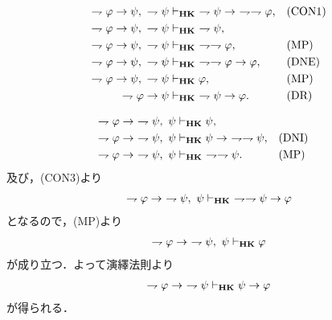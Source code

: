 	\begin{sketch}[CON3]
		\begin{align}
			\rightharpoondown \varphi \rightarrow \psi,\ \rightharpoondown \psi &\provable{\mbox{{\bf HK}}}
				\ \rightharpoondown \psi \rightarrow\ \rightharpoondown \rightharpoondown \varphi,
				&& \mbox{(CON1)} \\
			\rightharpoondown \varphi \rightarrow \psi,\ \rightharpoondown \psi &\provable{\mbox{{\bf HK}}}
				\ \rightharpoondown \psi, \\
			\rightharpoondown \varphi \rightarrow \psi,\ \rightharpoondown \psi &\provable{\mbox{{\bf HK}}}
				\ \rightharpoondown \rightharpoondown \varphi, && \mbox{(MP)} \\
			\rightharpoondown \varphi \rightarrow \psi,\ \rightharpoondown \psi &\provable{\mbox{{\bf HK}}}
				\ \rightharpoondown \rightharpoondown \varphi \rightarrow \varphi, && \mbox{(DNE)} \\
			\rightharpoondown \varphi \rightarrow \psi,\ \rightharpoondown \psi &\provable{\mbox{{\bf HK}}}
				\varphi, && \mbox{(MP)} \\
			\rightharpoondown \varphi \rightarrow \psi &\provable{\mbox{{\bf HK}}}
				\ \rightharpoondown \psi \rightarrow \varphi. && \mbox{(DR)}
		\end{align}
		\QED
	\end{sketch}
	
	\begin{sketch}[CON4]
		\begin{align}
			\rightharpoondown \varphi \rightarrow\ \rightharpoondown \psi,\ \psi &\vdash_{{\scriptsize \mbox{{\bf HK}}}} \psi, \\
			\rightharpoondown \varphi \rightarrow\ \rightharpoondown \psi,\ \psi &\vdash_{{\scriptsize \mbox{{\bf HK}}}} 
				\psi \rightarrow\ \rightharpoondown \rightharpoondown \psi, && \mbox{(DNI)} \\
			\rightharpoondown \varphi \rightarrow\ \rightharpoondown \psi,\ \psi &\vdash_{{\scriptsize \mbox{{\bf HK}}}} 
				\ \rightharpoondown \rightharpoondown \psi. && \mbox{(MP)}
		\end{align}
		及び，(CON3)より
		\begin{align}
			\rightharpoondown \varphi \rightarrow\ \rightharpoondown \psi,\ \psi \vdash_{{\scriptsize \mbox{{\bf HK}}}} 
				\ \rightharpoondown \rightharpoondown \psi \rightarrow \varphi
		\end{align}
		となるので，(MP)より
		\begin{align}
			\rightharpoondown \varphi \rightarrow\ \rightharpoondown \psi,\ \psi \vdash_{{\scriptsize \mbox{{\bf HK}}}} \varphi
		\end{align}
		が成り立つ．よって演繹法則より
		\begin{align}
			\rightharpoondown \varphi \rightarrow\ \rightharpoondown \psi \vdash_{{\scriptsize \mbox{{\bf HK}}}} \psi \rightarrow \varphi
		\end{align}
		が得られる．
		\QED
	\end{sketch}
	
